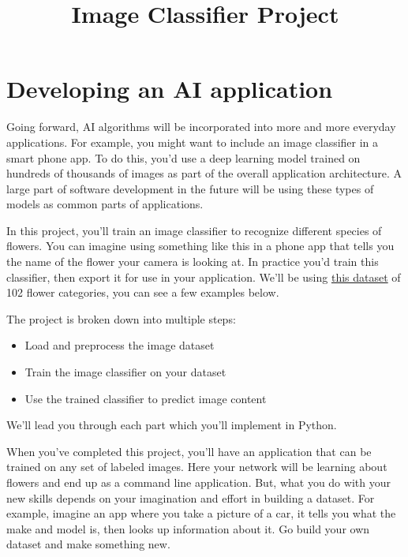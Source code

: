 \documentclass[11pt]{article}
\title{Image Classifier Project}
\providecommand{\tightlist}{%
      \setlength{\itemsep}{0pt}\setlength{\parskip}{0pt}}
\begin{document}
    
    
    \maketitle
    
    

    
    \section{Developing an AI
application}\label{developing-an-ai-application}

Going forward, AI algorithms will be incorporated into more and more
everyday applications. For example, you might want to include an image
classifier in a smart phone app. To do this, you'd use a deep learning
model trained on hundreds of thousands of images as part of the overall
application architecture. A large part of software development in the
future will be using these types of models as common parts of
applications.

In this project, you'll train an image classifier to recognize different
species of flowers. You can imagine using something like this in a phone
app that tells you the name of the flower your camera is looking at. In
practice you'd train this classifier, then export it for use in your
application. We'll be using
\href{http://www.robots.ox.ac.uk/~vgg/data/flowers/102/index.html}{this
dataset} of 102 flower categories, you can see a few examples below.

The project is broken down into multiple steps:

\begin{itemize}
\tightlist
\item
  Load and preprocess the image dataset
\item
  Train the image classifier on your dataset
\item
  Use the trained classifier to predict image content
\end{itemize}

We'll lead you through each part which you'll implement in Python.

When you've completed this project, you'll have an application that can
be trained on any set of labeled images. Here your network will be
learning about flowers and end up as a command line application. But,
what you do with your new skills depends on your imagination and effort
in building a dataset. For example, imagine an app where you take a
picture of a car, it tells you what the make and model is, then looks up
information about it. Go build your own dataset and make something new.
\end{document}
